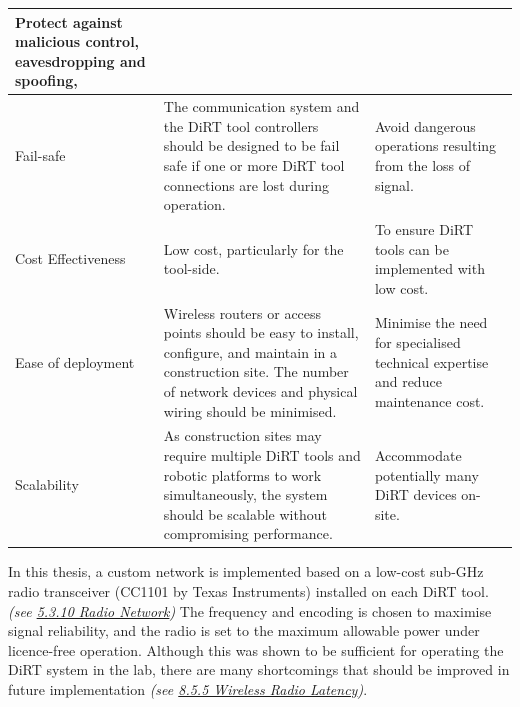 \documentclass[11pt]{book}
\begin{document}
\begin{table}[H]
\begin{adjustbox}{max width=\textwidth}
\begin{tabular}{p{2.33cm}p{8.25cm}p{5.34cm}}
\multicolumn{1}{|p{5.34cm}|}{{\footnotesize Protect against malicious control, eavesdropping and spoofing, }} \\ 
\hline
\multicolumn{1}{|p{2.33cm}}{{\footnotesize Fail-safe}} & 
\multicolumn{1}{|p{8.25cm}}{{\footnotesize The communication system and the DiRT tool controllers should be designed to be fail safe if one or more DiRT tool connections are lost during operation. \par}} & 
\multicolumn{1}{|p{5.34cm}|}{{\footnotesize Avoid dangerous operations resulting from the loss of signal.}} \\ 
\hline
\multicolumn{1}{|p{2.33cm}}{{\footnotesize Cost Effectiveness}} & 
\multicolumn{1}{|p{8.25cm}}{{\footnotesize Low cost, particularly for the tool-side.}} & 
\multicolumn{1}{|p{5.34cm}|}{{\footnotesize To ensure DiRT tools can be implemented with low cost.}} \\ 
\hline
\multicolumn{1}{|p{2.33cm}}{{\footnotesize Ease of deployment}} & 
\multicolumn{1}{|p{8.25cm}}{{\footnotesize Wireless routers or access points should be easy to install, configure, and maintain in a construction site. The number of network devices and physical wiring should be minimised.\par}} & 
\multicolumn{1}{|p{5.34cm}|}{{\footnotesize Minimise the need for specialised technical expertise and reduce maintenance cost.}} \\ 
\hline
\multicolumn{1}{|p{2.33cm}}{{\footnotesize Scalability}} & 
\multicolumn{1}{|p{8.25cm}}{{\footnotesize As construction sites may require multiple DiRT tools and robotic platforms to work simultaneously, the system should be scalable without compromising performance.\par}} & 
\multicolumn{1}{|p{5.34cm}|}{{\footnotesize Accommodate potentially many DiRT devices on-site.}} \\ 
\hline
\end{tabular}
\end{adjustbox}
\end{table}
\vspace{1\baselineskip}
In this thesis, a custom network is implemented based on a low-cost sub-GHz radio transceiver (CC1101 by Texas Instruments) installed on each DiRT tool. \textit{(see \uline{5.3.10 Radio Network}) }The frequency and encoding is chosen to maximise signal reliability, and the radio is set to the maximum allowable power under licence-free operation. Although this was shown to be sufficient for operating the DiRT system in the lab, there are many shortcomings that should be improved in future implementation \textit{(see \uline{8.5.5 Wireless Radio Latency})}.
\end{document}
